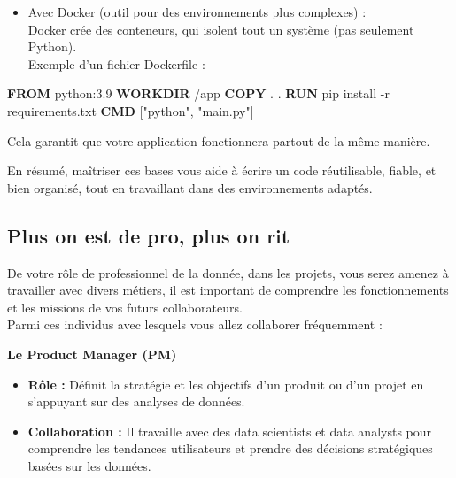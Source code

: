 \documentclass[
  letterpaper,
  DIV=11,
  numbers=noendperiod]{scrartcl}
\newenvironment{Shaded}{\begin{snugshade}}{\end{snugshade}}
\newcommand{\AttributeTok}[1]{\textcolor[rgb]{0.40,0.45,0.13}{#1}}
\newcommand{\ExtensionTok}[1]{\textcolor[rgb]{0.00,0.23,0.31}{#1}}
\newcommand{\KeywordTok}[1]{\textcolor[rgb]{0.00,0.23,0.31}{\textbf{#1}}}
\newcommand{\NormalTok}[1]{\textcolor[rgb]{0.00,0.23,0.31}{#1}}
\newcommand{\StringTok}[1]{\textcolor[rgb]{0.13,0.47,0.30}{#1}}
\providecommand{\tightlist}{%
  \setlength{\itemsep}{0pt}\setlength{\parskip}{0pt}}\usepackage{longtable,booktabs,array}
\begin{document}
\begin{itemize}
\tightlist
\item
  Avec Docker (outil pour des environnements plus complexes) :\\
  Docker crée des conteneurs, qui isolent tout un système (pas seulement
  Python).\\
  Exemple d'un fichier Dockerfile :
\end{itemize}

\begin{Shaded}
\begin{Highlighting}[]
\KeywordTok{FROM}\NormalTok{ python:3.9}
\KeywordTok{WORKDIR}\NormalTok{ /app}
\KeywordTok{COPY}\NormalTok{ . .}
\KeywordTok{RUN} \ExtensionTok{pip}\NormalTok{ install }\AttributeTok{{-}r}\NormalTok{ requirements.txt}
\KeywordTok{CMD}\NormalTok{ [}\StringTok{"python"}\NormalTok{, }\StringTok{"main.py"}\NormalTok{]}
\end{Highlighting}
\end{Shaded}

Cela garantit que votre application fonctionnera partout de la même
manière.

En résumé, maîtriser ces bases vous aide à écrire un code réutilisable,
fiable, et bien organisé, tout en travaillant dans des environnements
adaptés.

\subsection{Plus on est de pro, plus on
rit}\label{plus-on-est-de-pro-plus-on-rit}

De votre rôle de professionnel de la donnée, dans les projets, vous
serez amenez à travailler avec divers métiers, il est important de
comprendre les fonctionnements et les missions de vos futurs
collaborateurs.\\
Parmi ces individus avec lesquels vous allez collaborer fréquemment :

\textbf{Le Product Manager (PM)}

\begin{itemize}
\tightlist
\item
  \textbf{Rôle :} Définit la stratégie et les objectifs d'un produit ou
  d'un projet en s'appuyant sur des analyses de données.
\item
  \textbf{Collaboration :} Il travaille avec des data scientists et data
  analysts pour comprendre les tendances utilisateurs et prendre des
  décisions stratégiques basées sur les données.
\end{itemize}
\end{document}

